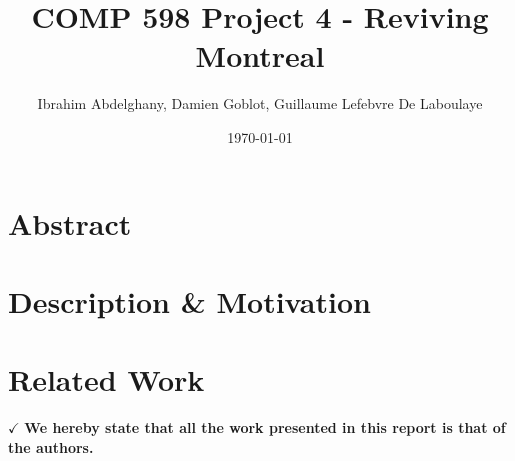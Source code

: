 \documentclass[10pt,twocolumn]{article}
\title{\Large COMP 598 Project 4 - Reviving Montreal}
\author{\normalsize Ibrahim Abdelghany,  Damien Goblot, Guillaume Lefebvre De Laboulaye}
\date{\normalsize \today}
\begin{document}
 
\maketitle 
{} 

\section*{Abstract}

\section{Description \& Motivation} 

\section{Related Work}

$\checkmark$ \textbf{We hereby state that all the work presented in this report is that of the authors. }

\scriptsize   


\end{document}
